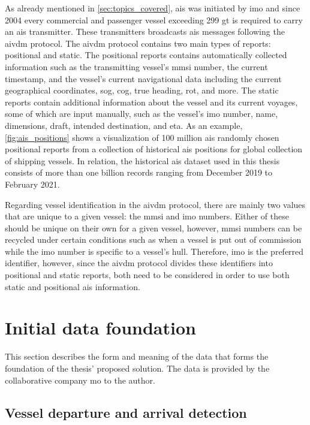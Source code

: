 As already mentioned in \cref{sec:topics_covered}, \acrfull{ais} was initiated by \acrfull{imo} and since 2004 every commercial and passenger vessel exceeding 299 \acrfull{gt} is required to carry an \acrshort{ais} transmitter. These transmitters broadcasts \acrshort{ais} messages following the \gls{aivdm} protocol. The \gls{aivdm} protocol contains two main types of reports: positional and static. The positional reports contains automatically collected information such as the transmitting vessel's \acrfull{mmsi} number, the current timestamp, and the vessel's current navigational data including the current geographical coordinates, \acrfull{sog}, \acrfull{cog}, true heading, \acrfull{rot}, and more. The static reports contain additional information about the vessel and its current voyages, some of which are input manually, such as the vessel's \acrshort{imo} number, name, dimensions, draft, intended destination, and \acrfull{eta}. As an example, \cref{fig:ais_positions} shows a visualization of 100 million \acrshort{ais} randomly chosen positional reports from a collection of historical \acrshort{ais} positions for global collection of shipping vessels. In relation, the historical \acrshort{ais} dataset used in this thesis consists of more than one billion records ranging from December 2019 to February 2021.

Regarding vessel identification in the \gls{aivdm} protocol, there are mainly two values that are unique to a given vessel: the \acrshort{mmsi} and \acrshort{imo} numbers. Either of these should be unique on their own for a given vessel, however, \acrshort{mmsi} numbers can be recycled under certain conditions such as when a vessel is put out of commission while the \acrshort{imo} number is specific to a vessel's hull. Therefore, \acrshort{imo} is the preferred identifier, however, since the \gls{aivdm} protocol divides these identifiers into positional and static reports, both need to be considered in order to use both static and positional \acrshort{ais} information.

\section{Initial data foundation}

This section describes the form and meaning of the data that forms the foundation of the thesis' proposed solution. The data is provided by the collaborative company \acrfull{mo} to the author.

\subsection{Vessel departure and arrival detection}
\label{sec:vessel_transitions}

